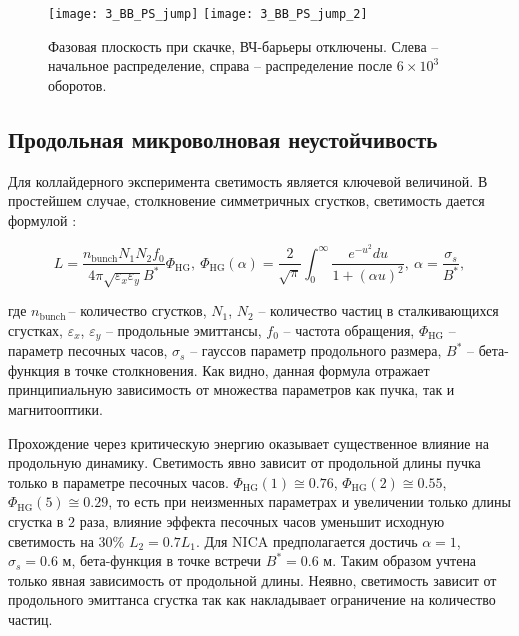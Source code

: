\begin{figure}[!h]
   \texttt{[image: 3\_BB\_PS\_jump]}
   \texttt{[image: 3\_BB\_PS\_jump\_2]}
   \caption{Фазовая плоскость при скачке, ВЧ-барьеры отключены. Слева – начальное распределение, справа – распределение после $6\times{10}^3$ оборотов.}
   \label{fig:BB_PS_jump}
\end{figure}

\subsection{Продольная микроволновая неустойчивость}\label{sec:transition_jump/microwave_instab}

\par Для коллайдерного эксперимента светимость является ключевой величиной. В простейшем случае, столкновение симметричных сгустков, светимость дается формулой \cite{meshkov:luminocity}:

\begin{equation}
L=\frac{n_{\mathrm{bunch}}N_1N_2f_0}{4\pi\sqrt{\varepsilon_x\varepsilon_y}B^\ast}\Phi_{\textrm{HG}}, \
\Phi_{\textrm{HG}}(\alpha)=\frac{2}{\sqrt\pi}\int_{0}^{\infty}\frac{e^{-u^2}du}{1+(\alpha u)^2},\
\alpha=\frac{\sigma_s}{B^\ast},
\label{eq:luminocity}
\end{equation}

\noindent где $n_{\mathrm{bunch\ }}$– количество сгустков, $N_1$, $N_2$ – количество частиц в сталкивающихся сгустках, $\varepsilon_x$, $\varepsilon_y$ – продольные эмиттансы, $f_0$ – частота обращения, $\Phi_{\textrm{HG}}$ – параметр песочных часов, $\sigma_s$ – гауссов параметр продольного размера, $B^\ast$ – бета-функция в точке столкновения. Как видно, данная формула отражает принципиальную зависимость от множества параметров как пучка, так и магнитооптики.

\par Прохождение через критическую энергию оказывает существенное влияние на продольную динамику. Светимость явно зависит от продольной длины пучка только в параметре песочных часов. $\Phi_{\textrm{HG}}(1)\cong0.76$, $\Phi_{\textrm{HG}}(2)\cong0.55$, $\Phi_{\textrm{HG}}(5)\cong0.29$, то есть при неизменных параметрах и увеличении только длины сгустка в $2$ раза, влияние эффекта песочных часов уменьшит исходную светимость на $30\%$ $L_2=0.7L_1$. Для NICA предполагается достичь $\alpha=1$, $\sigma_s=0.6$ м, бета-функция в точке встречи $B^\ast=0.6$ м. Таким образом учтена только явная зависимость от продольной длины. Неявно, светимость зависит от продольного эмиттанса сгустка так как накладывает ограничение на количество частиц.

